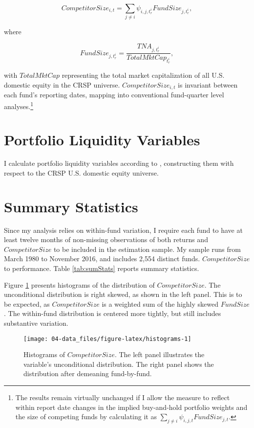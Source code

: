\documentclass[openany]{book}
\let\rmarkdownfootnote\footnote%
\def\footnote{\protect\rmarkdownfootnote}
\theoremstyle{definition}
\theoremstyle{definition}
\theoremstyle{definition}
\theoremstyle{remark}
\begin{document}
\begin{equation}
CompetitorSize_{i,t} = \sum_{j\neq i} \psi_{i,j,t^i_r} FundSize_{j,t^i_r},
\end{equation}

where

\begin{equation}
FundSize_{j,t^i_r}=\frac{TNA_{j,t^i_r}}{TotalMktCap_{t^i_r}},
\end{equation}

with \(TotalMktCap\) representing the total market capitalization of all
U.S. domestic equity in the CRSP universe. \(CompetitorSize_{i,t}\) is
invariant between each fund's reporting dates, mapping into conventional
fund-quarter level analyses.\footnote{The results remain virtually
  unchanged if I allow the measure to reflect within report date changes
  in the implied buy-and-hold portfolio weights and the size of
  competing funds by calculating it as
  \(\sum_{j\neq i}\psi_{i,j,t} FundSize_{j,t}\).}

\section{Portfolio Liquidity
Variables}\label{portfolio-liquidity-variables}

I calculate portfolio liquidity variables according to \citet{pst17L},
constructing them with respect to the CRSP U.S. domestic equity
universe.

\section{Summary Statistics}\label{sec:sumStats}

Since my analysis relies on within-fund variation, I require each fund
to have at least twelve months of non-missing observations of both
returns and \(CompetitorSize\) to be included in the estimation sample.
My sample runs from March 1980 to November 2016, and includes 2,554
distinct funds. \(CompetitorSize\) to performance. Table
\ref{tab:sumStats} reports summary statistics.

Figure \ref{fig:histograms} presents histograms of the distribution of
\(CompetitorSize\). The unconditional distribution is right skewed, as
shown in the left panel. This is to be expected, as \(CompetitorSize\)
is a weighted sum of the highly skewed \(FundSize\). The within-fund
distribution is centered more tightly, but still includes substantive
variation.

\begin{figure}

{\centering \texttt{[image: 04-data\_files/figure-latex/histograms-1]} 

}

\caption{Histograms of $CompetitorSize$. The left panel illustrates the variable's unconditional distribution. The right panel shows the distribution after demeaning fund-by-fund.}\label{fig:histograms}
\end{figure}
\end{document}
